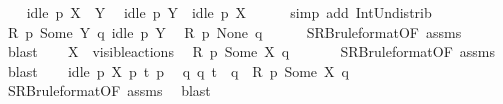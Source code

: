\begin{isabellebody}
\ \ \isamarkupfalse%
\ {\isacartoucheopen}idle\ p\ {\isacharparenleft}{\kern0pt}X\ {\isasymunion}\ Y{\isacharparenright}{\kern0pt}{\isacartoucheclose}\ \isamarkupfalse%
\ {\isacartoucheopen}idle\ p\ Y{\isacartoucheclose}\ \ {\isacartoucheopen}idle\ p\ X{\isacartoucheclose}\isanewline
\ \ \ \ \isamarkupfalse%
\ {\isacharparenleft}{\kern0pt}simp\ add{\isacharcolon}{\kern0pt}\ Int{\isacharunderscore}{\kern0pt}Un{\isacharunderscore}{\kern0pt}distrib{\isacharparenright}{\kern0pt}{\isacharplus}{\kern0pt}\isanewline
\ \ \isamarkupfalse%
\ {\isacartoucheopen}R\ p\ {\isacharparenleft}{\kern0pt}Some\ Y{\isacharparenright}{\kern0pt}\ q{\isacartoucheclose}\ {\isacartoucheopen}idle\ p\ Y{\isacartoucheclose}\ \isamarkupfalse%
\ {\isacartoucheopen}R\ p\ None\ q{\isacartoucheclose}\isanewline
\ \ \ \ \isamarkupfalse%
\ SRB{\isacharunderscore}{\kern0pt}ruleformat{\isacharparenleft}{\kern0pt}{}{\isacharparenright}{\kern0pt}{\isacharbrackleft}{\kern0pt}OF\ assms{\isacharbrackright}{\kern0pt}\ \isamarkupfalse%
\ blast\isanewline
\ \ \isamarkupfalse%
\ {\isacartoucheopen}X\ {\isasymsubseteq}\ visible{\isacharunderscore}{\kern0pt}actions{\isacartoucheclose}\ \isamarkupfalse%
\ {\isacartoucheopen}R\ p\ {\isacharparenleft}{\kern0pt}Some\ X{\isacharparenright}{\kern0pt}\ q{\isacartoucheclose}\ \isanewline
\ \ \ \ \isamarkupfalse%
\ SRB{\isacharunderscore}{\kern0pt}ruleformat{\isacharparenleft}{\kern0pt}{}{\isacharparenright}{\kern0pt}{\isacharbrackleft}{\kern0pt}OF\ assms{\isacharbrackright}{\kern0pt}\ \isamarkupfalse%
\ blast\isanewline
\ \ \isamarkupfalse%
\ {\isacartoucheopen}idle\ p\ X{\isacartoucheclose}\ {\isacartoucheopen}p\ {\isasymlongmapsto}t\ p{\isacharprime}{\kern0pt}{\isacartoucheclose}\ \isamarkupfalse%
\ {\isacartoucheopen}{\isasymexists}q{\isacharprime}{\kern0pt}{\isachardot}{\kern0pt}\ q\ {\isasymlongmapsto}t\ \ q{\isacharprime}{\kern0pt}\ {\isasymand}\ R\ p{\isacharprime}{\kern0pt}\ {\isacharparenleft}{\kern0pt}Some\ X{\isacharparenright}{\kern0pt}\ q{\isacharprime}{\kern0pt}{\isacartoucheclose}\isanewline
\ \ \ \ \isamarkupfalse%
\ SRB{\isacharunderscore}{\kern0pt}ruleformat{\isacharparenleft}{\kern0pt}{}{\isacharparenright}{\kern0pt}{\isacharbrackleft}{\kern0pt}OF\ assms{\isacharbrackright}{\kern0pt}\ \isamarkupfalse%
\ blast\isanewline
{}\isamarkupfalse%

\end{isabellebody}
